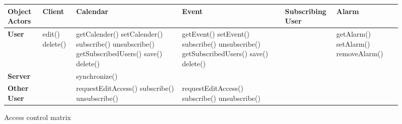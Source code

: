 \begin{figure}[hbp]
\hspace*{-1.5cm}\begin{tabular}{|p{1.8cm}|p{1.6cm}|p{3.7cm}|p{3.7cm}|p{2.2cm}|p{2.6cm}|}
\hline
\textbf{  Object  \newline Actors}
&
\textbf{Client}
&
\textbf{Calendar}
&
\textbf{Event}
&
\textbf{\mbox{Subscribing} User}
&
\textbf{Alarm} \\
\hline
\textbf{User}
& 
edit() \newline
delete() \newline
& 
getCalender()  \newline
setCalender()  \newline
subscribe() \newline
unsubscribe() \newline
getSubscribedUsers() \newline
save() \newline
delete() \newline
&
getEvent()  \newline
setEvent() \newline
subscribe() \newline
unsubscribe() \newline
getSubscribedUsers() \newline
save() \newline
delete() \newline
&
&
getAlarm()  \newline
setAlarm() \newline
removeAlarm() \newline
 \\ \hline
\textbf{Server}
& 
& 
synchronize() \newline
&
&
&
 \\ \hline
\textbf{Other User}
& 
& 
requestEditAccess()  \newline
subscribe()   \newline
unsubscribe() \newline
& 
requestEditAccess()  \newline
subscribe()  \newline
unsubscribe() \newline
& 
& 
 \\ \hline
\end{tabular}
\caption{\label{fig:AccessControlMatrix}Access control matrix}
\end{figure}